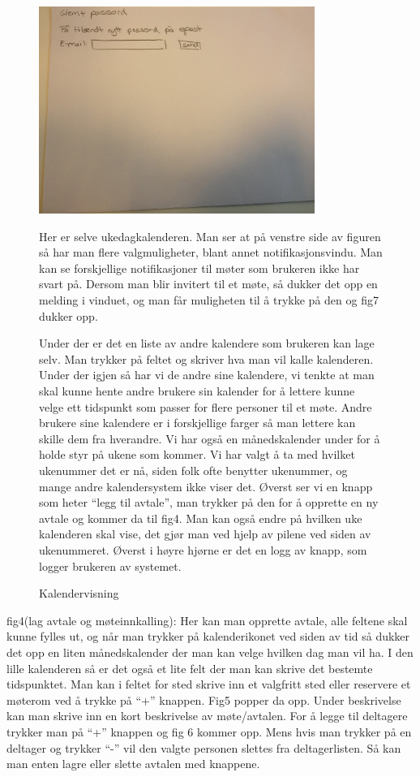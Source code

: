 \begin{figure}[ht!]
\centering
\includegraphics[width=90mm]{fig2.jpg}
\caption{Kalendervisning}
\label{overflow}
Her er selve ukedagkalenderen. Man ser at på venstre side av figuren så har man flere valgmuligheter, blant annet notifikasjonsvindu. Man kan se forskjellige notifikasjoner til møter som brukeren ikke har svart på. Dersom man blir invitert til et møte, så dukker det opp en melding i vinduet, og man får muligheten til å trykke på den og fig7 dukker opp. 

Under der er det en liste av andre kalendere som brukeren kan lage selv. Man trykker på feltet og skriver hva man vil kalle kalenderen. Under der igjen så har vi de andre sine kalendere, vi tenkte at man skal kunne hente andre brukere sin kalender for å lettere kunne velge ett tidspunkt som passer for flere personer til et møte. Andre brukere sine kalendere er i forskjellige farger så man lettere kan skille dem fra hverandre. Vi har også en månedskalender under for å holde styr på ukene som kommer. Vi har valgt å ta med hvilket ukenummer det er nå, siden folk ofte benytter ukenummer, og mange andre kalendersystem ikke viser det. Øverst ser vi en knapp som heter “legg til avtale”, man trykker på den for å opprette en ny avtale og kommer da til fig4. Man kan også endre på hvilken uke kalenderen skal vise, det gjør man ved hjelp av pilene ved siden av ukenummeret. Øverst i høyre hjørne er det en logg av knapp, som logger brukeren av systemet.
\end{figure}

fig4(lag avtale og møteinnkalling):
Her kan man opprette avtale, alle feltene skal kunne fylles ut, og når man trykker på kalenderikonet ved siden av tid så dukker det opp en liten månedskalender der man kan velge hvilken dag man vil ha. I den lille kalenderen så er det også et lite felt der man kan skrive det bestemte tidspunktet. Man kan i feltet for sted skrive inn et valgfritt sted eller reservere et møterom ved å trykke på “+” knappen. Fig5 popper da opp.
Under beskrivelse kan man skrive inn en kort beskrivelse av møte/avtalen. For å legge til deltagere trykker man på  “+” knappen og fig 6 kommer opp. Mens hvis man trykker på en deltager og trykker “-”  vil den valgte personen slettes fra deltagerlisten. Så kan man enten lagre eller slette avtalen med knappene. 

